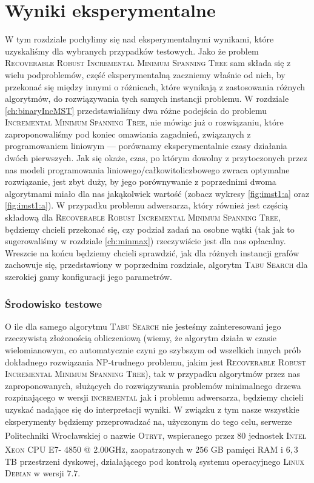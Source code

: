 \chapter{Wyniki eksperymentalne}\label{ch:exp}
\thispagestyle{chapterBeginStyle}

W tym rozdziale pochylimy się nad eksperymentalnymi wynikami, które uzyskaliśmy dla wybranych przypadków testowych. Jako że problem \textsc{Recoverable Robust Incremental Minimum Spanning Tree} sam składa się z wielu podproblemów, część eksperymentalną zaczniemy właśnie od nich, by przekonać się między innymi o różnicach, które wynikają z zastosowania różnych algorytmów, do rozwiązywania tych samych instancji problemu. W rozdziale \ref{ch:binaryIncMST} przedstawialiśmy dwa różne podejścia do problemu \textsc{Incremental Minimum Spanning Tree}, nie mówiąc już o rozwiązaniu, które zaproponowaliśmy pod koniec omawiania zagadnień, związanych z programowaniem liniowym --- porównamy eksperymentalnie czasy działania dwóch pierwszych. Jak się okaże, czas, po którym dowolny z przytoczonych przez nas modeli programowania liniowego/całkowitoliczbowego zwraca optymalne rozwiązanie, jest zbyt duży, by jego porównywanie z poprzednimi dwoma algorytmami miało dla nas jakąkolwiek wartość (zobacz wykresy \ref{fig:imst1:a} oraz \ref{fig:imst1:a}). W przypadku problemu adwersarza, który również jest częścią składową dla \textsc{Recoverable Robust Incremental Minimum Spanning Tree}, będziemy chcieli przekonać się, czy podział zadań na osobne wątki (tak jak to sugerowaliśmy w rozdziale \ref{ch:minmax}) rzeczywiście jest dla nas opłacalny. Wreszcie na końcu będziemy chcieli sprawdzić, jak dla różnych instancji grafów zachowuje się, przedstawiony w poprzednim rozdziale, algorytm \textsc{Tabu Search} dla szerokiej gamy konfiguracji jego parametrów.

\subsection{Środowisko testowe}

O ile dla samego algorytmu \textsc{Tabu Search} nie jesteśmy zainteresowani jego rzeczywistą złożonością obliczeniową (wiemy, że algorytm działa w czasie wielomianowym, co automatycznie czyni go szybszym od wszelkich innych prób dokładnego rozwiązania \textsc{NP}-trudnego problemu, jakim jest \textsc{Recoverable Robust Incremental Minimum Spanning Tree}), tak w przypadku algorytmów przez nas zaproponowanych, służących do rozwiązywania problemów minimalnego drzewa rozpinającego w wersji \textsc{incremental} jak i problemu adwersarza, będziemy chcieli uzyskać nadające się do interpretacji wyniki. W związku z tym nasze wszystkie eksperymenty będziemy przeprowadzać na, użyczonym do tego celu, serwerze Politechniki Wrocławskiej o nazwie \textsc{Otryt}, wspieranego przez $80$ jednostek \textsc{Intel\textsuperscript{\textregistered} Xeon\textsuperscript{\textregistered} CPU E7- 4850  @ 2.00GHz}, zaopatrzonych w $256$ \textsc{GB} pamięci \textsc{RAM} i $6,3$ \textsc{TB} przestrzeni dyskowej, działającego pod kontrolą systemu operacyjnego \textsc{Linux Debian} w wersji $7.7$.

